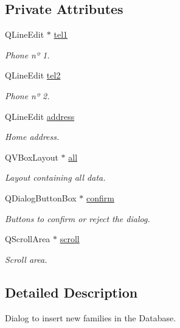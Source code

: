 \subsection*{Private Attributes}
\begin{DoxyCompactItemize}
\item 
Q\+Line\+Edit $\ast$ \hyperlink{class_ins_dialog_a7dc562149fa67417983c78fe2621d7f9}{tel1}
\begin{DoxyCompactList}\small\item\em Phone nº 1. \end{DoxyCompactList}\item 
Q\+Line\+Edit \hyperlink{class_ins_dialog_a79832ba6767602ed1d07b9b707bbfd1f}{tel2}
\begin{DoxyCompactList}\small\item\em Phone nº 2. \end{DoxyCompactList}\item 
Q\+Line\+Edit \hyperlink{class_ins_dialog_a14da50d5cdf18e266b1d198ebbd20770}{address}
\begin{DoxyCompactList}\small\item\em Home address. \end{DoxyCompactList}\item 
Q\+V\+Box\+Layout $\ast$ \hyperlink{class_ins_dialog_ab8de5f3cd72b44a3b3524fc52bac148c}{all}
\begin{DoxyCompactList}\small\item\em Layout containing all data. \end{DoxyCompactList}\item 
Q\+Dialog\+Button\+Box $\ast$ \hyperlink{class_ins_dialog_aa77dfa096f7cd3bc82823f6944ecbd8b}{confirm}
\begin{DoxyCompactList}\small\item\em Buttons to confirm or reject the dialog. \end{DoxyCompactList}\item 
Q\+Scroll\+Area $\ast$ \hyperlink{class_ins_dialog_a822e0887cf9597f75ed5c4a772a8c9db}{scroll}
\begin{DoxyCompactList}\small\item\em Scroll area. \end{DoxyCompactList}\end{DoxyCompactItemize}


\subsection{Detailed Description}
Dialog to insert new families in the Database. 

